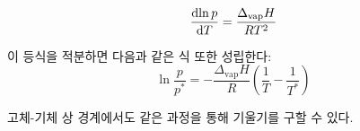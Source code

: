         \begin{law}
        \begin{equation*}
            \frac{\operatorname{d\!} \ln{p}}{\operatorname{d\!} T} = \frac{\Delta_\mathrm{vap}H}{RT^2}
        \end{equation*}
        \end{law}
        이 등식을 적분하면 다음과 같은 식 또한 성립한다:
        \begin{equation*}
            \ln{\frac{p}{p^\ast}} = -\frac{\Delta_\mathrm{vap}H}{R}\left(\frac{1}{T} - \frac{1}{T^\ast}\right)
        \end{equation*}
        \par 고체-기체 상 경계에서도 같은 과정을 통해 기울기를 구할 수 있다.